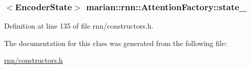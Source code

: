 \subsubsection[{\texorpdfstring{state\+\_\+}{state_}}]{$<${\bf Encoder\+State}$>$ marian\+::rnn\+::\+Attention\+Factory\+::state\+\_\+\hspace{0.3cm}{\ttfamily [protected]}}\hypertarget{classmarian_1_1rnn_1_1AttentionFactory_a8dccbb224732caa5da73d4cb754a2a19}{}\label{classmarian_1_1rnn_1_1AttentionFactory_a8dccbb224732caa5da73d4cb754a2a19}


Definition at line 135 of file rnn/constructors.\+h.



The documentation for this class was generated from the following file\+:\begin{DoxyCompactItemize}
\item 
\hyperlink{rnn_2constructors_8h}{rnn/constructors.\+h}\end{DoxyCompactItemize}
